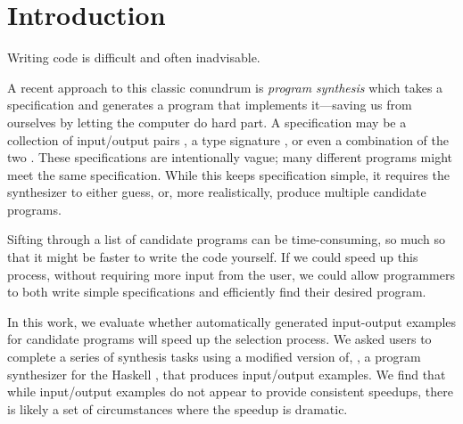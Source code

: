 \section{Introduction}
Writing code is difficult and often inadvisable.


A recent approach to this classic conundrum is \emph{program synthesis} which
takes a specification and generates a program that implements it---saving us
from ourselves by letting the computer do hard part.
%
A specification may be a collection of input/output pairs
\cite{Feser_Chaudhuri_Dillig_2015}, a type signature \cite{hoogle_plus_2020},
or even a combination of the two \cite{Osera_Zdancewic_2015}.
%
These specifications are intentionally vague; many different
programs might meet the same specification.
%
While this keeps specification simple, it requires the synthesizer to either guess,
or, more realistically, produce multiple candidate programs.

Sifting through a list of candidate programs can be time-consuming, so much so
that it might be faster to write the code yourself.
%
If we could speed up this process, without requiring more input from the
user, we could allow programmers to both write simple specifications and
efficiently find their desired program.

In this work, we evaluate whether automatically generated input-output examples
for candidate programs will speed up the selection process.
%
We asked users to complete a series of synthesis tasks using a modified
version of, \hoogleplus, a program synthesizer for the Haskell
\cite{hoogle_plus_2020}, that produces input/output examples.
%
We find that while input/output examples do not appear to provide consistent
speedups, there is likely a set of circumstances where the speedup is
dramatic.